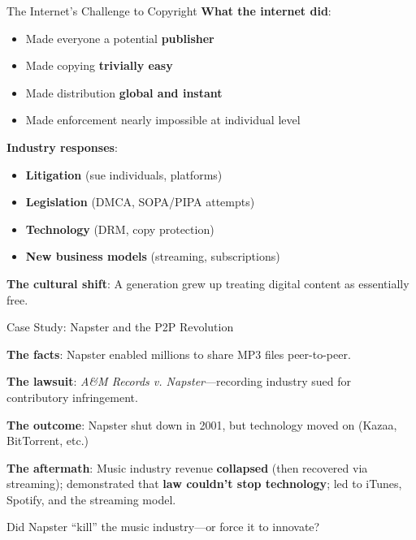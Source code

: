 ﻿\documentclass[aspectratio=169,11pt]{beamer}
\begin{document}
\begin{frame}{The Internet's Challenge to Copyright}
\textbf{What the internet did}:
\begin{itemize}
    \item Made everyone a potential \textbf{publisher}
    \item Made copying \textbf{trivially easy}
    \item Made distribution \textbf{global and instant}
    \item Made enforcement nearly impossible at individual level
\end{itemize}

\vspace{0.3cm}
\textbf{Industry responses}:
\begin{itemize}
    \item \textbf{Litigation} (sue individuals, platforms)
    \item \textbf{Legislation} (DMCA, SOPA/PIPA attempts)
    \item \textbf{Technology} (DRM, copy protection)
    \item \textbf{New business models} (streaming, subscriptions)
\end{itemize}

\vspace{0.2cm}
\textbf{The cultural shift}: A generation grew up treating digital content as essentially free.
\end{frame}

\begin{frame}{Case Study: Napster and the P2P Revolution}
\begin{casestudybox}[Napster (1999--2001)]
\textbf{The facts}: Napster enabled millions to share MP3 files peer-to-peer.

\textbf{The lawsuit}: \textit{A\&M Records v. Napster}---recording industry sued for contributory infringement.

\textbf{The outcome}: Napster shut down in 2001, but technology moved on (Kazaa, BitTorrent, etc.)
\end{casestudybox}

\vspace{0.2cm}
\textbf{The aftermath}: Music industry revenue \textbf{collapsed} (then recovered via streaming); demonstrated that \textbf{law couldn't stop technology}; led to iTunes, Spotify, and the streaming model.

\begin{discussionbox}[Discussion]
Did Napster ``kill'' the music industry---or force it to innovate?
\end{discussionbox}
\end{frame}
\end{document}
